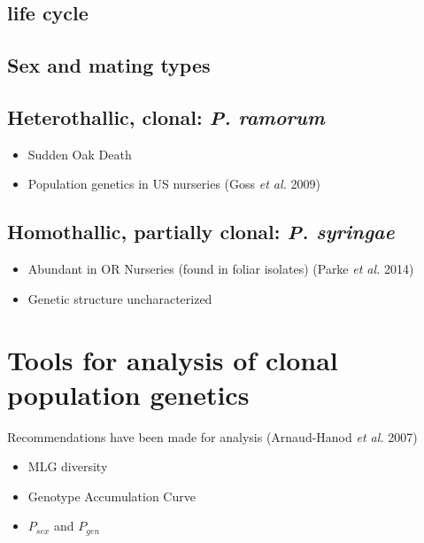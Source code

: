 \documentclass[double,12pt]{beavtex}
\providecommand{\tightlist}{%
  \setlength{\itemsep}{0pt}\setlength{\parskip}{0pt}}
\begin{document}
  \subsection{life cycle}\label{life-cycle}
  
  \subsection{Sex and mating types}\label{sex-and-mating-types}
  
  \subsection{\texorpdfstring{Heterothallic, clonal: \emph{P.
  ramorum}}{Heterothallic, clonal: P. ramorum}}\label{heterothallic-clonal-p.-ramorum}
  
  \begin{itemize}
  \tightlist
  \item
    Sudden Oak Death
  \item
    Population genetics in US nurseries (Goss \emph{et al.} 2009)
  \end{itemize}
  
  \subsection{\texorpdfstring{Homothallic, partially clonal: \emph{P.
  syringae}}{Homothallic, partially clonal: P. syringae}}\label{homothallic-partially-clonal-p.-syringae}
  
  \begin{itemize}
  \tightlist
  \item
    Abundant in OR Nurseries (found in foliar isolates) (Parke \emph{et
    al.} 2014)
  \item
    Genetic structure uncharacterized
  \end{itemize}
  
  \section{Tools for analysis of clonal population
  genetics}\label{tools-for-analysis-of-clonal-population-genetics}
  
  Recommendations have been made for analysis (Arnaud-Hanod \emph{et al.}
  2007)
  
  \begin{itemize}
  \tightlist
  \item
    MLG diversity
  \item
    Genotype Accumulation Curve
  \item
    \(P_{sex}\) and \(P_{gen}\)
  \end{itemize}
  
\end{document}
